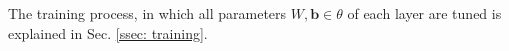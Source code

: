         
        
        The training process, in which all parameters $W, \mathbf{b} \in \theta$ of each layer are tuned is explained in Sec. \ref{ssec: training}.
        

